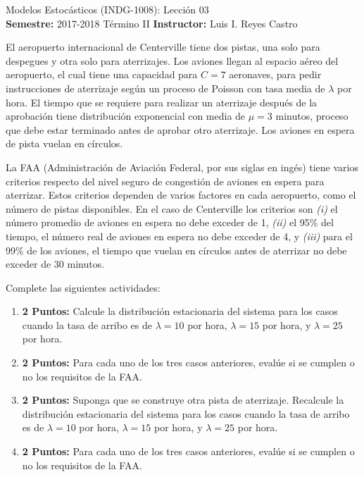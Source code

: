 \documentclass[ a4paper, twoside, 11pt]{article}
\newcommand{\numero}{03}
\begin{document}
\allowdisplaybreaks



\begin{center}
\Large Modelos Estoc\'asticos (INDG-1008): Lecci\'on \numero \\[2ex]
\small \textbf{Semestre:} 2017-2018 T\'ermino II \qquad
\textbf{Instructor:} Luis I. Reyes Castro
\end{center}
\fullskip

\begin{problem}
El aeropuerto internacional de Centerville tiene dos pistas, una solo para despegues y otra solo para aterrizajes. Los aviones llegan al espacio a\'ereo del aeropuerto, el cual tiene una capacidad para $C = 7$ aeronaves, para pedir instrucciones de aterrizaje seg\'un un proceso de Poisson con tasa media de $\lambda$ por hora. El tiempo que se requiere para realizar un aterrizaje despu\'es de la aprobaci\'on tiene distribuci\'on exponencial con media de $\mu = 3$ minutos, proceso que debe estar terminado antes de aprobar otro aterrizaje. Los aviones en espera de pista vuelan en c\'irculos. 

La FAA (Administraci\'on de Aviaci\'on Federal, por sus siglas en ing\'es) tiene varios criterios respecto del nivel seguro de congesti\'on de aviones en espera para aterrizar. Estos criterios dependen de varios factores en cada aeropuerto, como el n\'umero de pistas disponibles. En el caso de Centerville los criterios son \textit{(i)} el n\'umero promedio de aviones en espera no debe exceder de 1, \textit{(ii)} el 95\% del tiempo, el n\'umero real de aviones en espera no debe exceder de 4, y \textit{(iii)} para el 99\% de los aviones, el tiempo que vuelan en c\'irculos antes de aterrizar no debe exceder de 30 minutos. 

Complete las siguientes actividades: 
\begin{enumerate}[label=\textbf{\alph*)}]
\item \textbf{2 Puntos:} Calcule la distribuci\'on estacionaria del sistema para los casos cuando la tasa de arribo es de $\lambda = 10$ por hora, $\lambda = 15$ por hora, y $\lambda = 25$ por hora. 
\item \textbf{2 Puntos:} Para cada uno de los tres casos anteriores, eval\'ue si se cumplen o no los requisitos de la FAA. 
\item \textbf{2 Puntos:} Suponga que se construye otra pista de aterrizaje. Recalcule la distribuci\'on estacionaria del sistema para los casos cuando la tasa de arribo es de $\lambda = 10$ por hora, $\lambda = 15$ por hora, y $\lambda = 25$ por hora. 
\item \textbf{2 Puntos:} Para cada uno de los tres casos anteriores, eval\'ue si se cumplen o no los requisitos de la FAA. 
\end{enumerate}

\end{problem}
\fullskip
\end{document}
